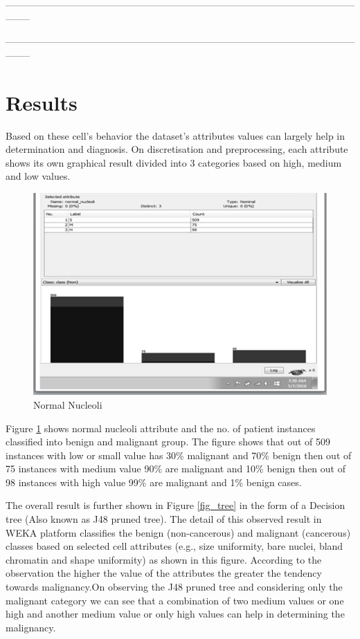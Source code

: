 \documentclass[conference]{IEEEtran}
\begin{document}
 --------------------------------------------------------------------------------------------------------------------





 --------------------------------------------------------------------------------------------------------------------
\section{Results}


Based on these cell's behavior the dataset's attributes values can largely help in determination and diagnosis. On discretisation and preprocessing, each attribute shows its own graphical result divided into 3 categories based on high, medium and low values. 

\begin{figure}[!h]
\centering
\includegraphics[scale=0.7]{normalnucleoliblack}
\caption{Normal Nucleoli}
\label{fig_nucle}

\end{figure}

Figure \ref{fig_nucle}  shows normal nucleoli attribute and the no. of patient instances classified into benign and malignant group. The figure shows that out of 509 instances with low or small value has 30\% malignant and 70\% benign then out of 75 instances with medium value 90\% are malignant and 10\% benign then out of 98 instances with high value 99\% are malignant and 1\% benign cases.

The overall result is further shown in Figure \ref{fig_tree} in the form of a Decision tree (Also known as J48 pruned tree). The detail of this observed result in WEKA platform classifies the benign (non-cancerous) and malignant (cancerous) classes based on selected cell attributes (e.g., size uniformity, bare nuclei, bland chromatin and shape uniformity) as shown in this figure. According to the observation  the higher the value of the attributes the greater the tendency towards malignancy.On observing the J48 pruned tree and considering only the malignant category we can see that a combination of two medium values or one high and another medium value or only high values can help in determining the malignancy.
 
\end{document}
